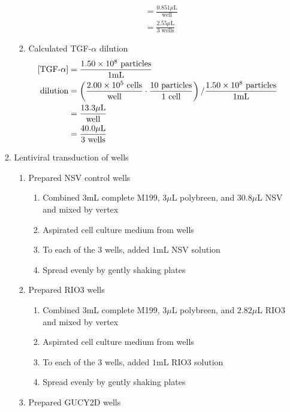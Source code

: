 \begin{enumerate}
\begin{enumerate}
\begin{enumerate}
\begin{align*}
							&= \frac{0.851\mu\text{L}}{\text{well}}\\
							&= \frac{2.55\mu\text{L}}{3\text{ wells}}
						\end{align*}
					\item Calculated TGF-$\alpha$ dilution
							\begin{align*}
							\text{[TGF-$\alpha$]} &= \frac{1.50\times 10^{8}\text{ particles}}{1\text{mL}}\\
							\text{dilution}&= \left(\frac{2.00\times 10^{5}\text{ cells}}{\text{well}}\cdot \frac{10\text{ particles}}{1\text{ cell}}\right)/\frac{1.50\times 10^{8}\text{ particles}}{1\text{mL}}\\
							&= \frac{13.3\mu\text{L}}{\text{well}}\\
							&= \frac{40.0\mu\text{L}}{3\text{ wells}}
						\end{align*}
				\end{enumerate}
			\item Lentiviral transduction of wells
				\begin{enumerate}
					\item Prepared NSV control wells
						\begin{enumerate}
							\item Combined $3$mL complete M199, $3\mu$L polybreen, and $30.8\mu$L NSV and mixed by vertex
							\item Aspirated cell culture medium from wells
							\item To each of the 3 wells, added $1$mL NSV solution
							\item Spread evenly by gently shaking plates
						\end{enumerate}
					\item Prepared RIO3 wells
						\begin{enumerate}
							\item Combined $3$mL complete M199, $3\mu$L polybreen, and $2.82\mu$L RIO3 and mixed by vertex
							\item Aspirated cell culture medium from wells
							\item To each of the 3 wells, added $1$mL RIO3 solution
							\item Spread evenly by gently shaking plates
						\end{enumerate}
					\item Prepared GUCY2D wells
						\begin{enumerate}

\end{enumerate}
\end{enumerate}
\end{enumerate}
\end{enumerate}
